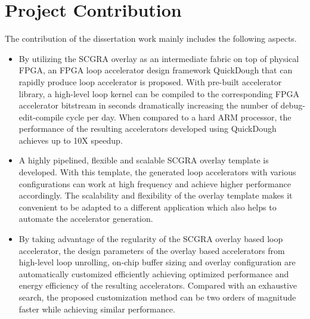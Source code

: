 \section{Project Contribution}
The contribution of the dissertation work mainly includes the following aspects.

\begin{itemize}
\item By utilizing the SCGRA overlay as an intermediate fabric on top of physical FPGA, an FPGA loop accelerator design framework QuickDough that can rapidly produce loop accelerator is proposed. With pre-built accelerator library, a high-level loop kernel can be compiled to the corresponding FPGA accelerator bitstream in seconds dramatically increasing the number of debug-edit-compile cycle per day. When compared to a hard ARM processor, the performance of the resulting accelerators developed using QuickDough achieves up to 10X speedup.

\item A highly pipelined, flexible and scalable SCGRA overlay template is developed. With this template, the generated loop accelerators with various configurations can work at high frequency and achieve higher performance accordingly. The scalability and flexibility of the overlay template makes it convenient to be adapted to a different application which also helps to automate the accelerator generation. 

\item By taking advantage of the regularity of the SCGRA overlay based loop accelerator, the design parameters of the overlay based accelerators from high-level loop unrolling, on-chip buffer sizing and overlay configuration are automatically customized efficiently achieving optimized performance and energy efficiency of the resulting accelerators. Compared with an exhaustive search, the proposed customization method can be two orders of magnitude faster while achieving similar performance.

\end{itemize}

